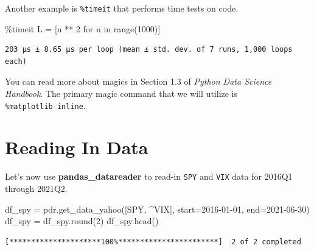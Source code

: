 \documentclass[
  letterpaper,
  DIV=11,
  numbers=noendperiod]{scrreprt}
\newenvironment{Shaded}{\begin{snugshade}}{\end{snugshade}}
\newcommand{\BuiltInTok}[1]{\textcolor[rgb]{0.00,0.23,0.31}{#1}}
\newcommand{\ControlFlowTok}[1]{\textcolor[rgb]{0.00,0.23,0.31}{#1}}
\newcommand{\DecValTok}[1]{\textcolor[rgb]{0.68,0.00,0.00}{#1}}
\newcommand{\KeywordTok}[1]{\textcolor[rgb]{0.00,0.23,0.31}{#1}}
\newcommand{\NormalTok}[1]{\textcolor[rgb]{0.00,0.23,0.31}{#1}}
\newcommand{\OperatorTok}[1]{\textcolor[rgb]{0.37,0.37,0.37}{#1}}
\newcommand{\StringTok}[1]{\textcolor[rgb]{0.13,0.47,0.30}{#1}}
\begin{document}
Another example is \texttt{\%timeit} that performs time tests on code.

\begin{Shaded}
\begin{Highlighting}[]
\OperatorTok{\%}\NormalTok{timeit L }\OperatorTok{=}\NormalTok{ [n }\OperatorTok{**} \DecValTok{2} \ControlFlowTok{for}\NormalTok{ n }\KeywordTok{in} \BuiltInTok{range}\NormalTok{(}\DecValTok{1000}\NormalTok{)]}
\end{Highlighting}
\end{Shaded}

\begin{verbatim}
203 µs ± 8.65 µs per loop (mean ± std. dev. of 7 runs, 1,000 loops each)
\end{verbatim}

You can read more about magics in Section 1.3 of \emph{Python Data
Science Handbook}. The primary magic command that we will utilize is
\texttt{\%matplotlib\ inline}.

\hypertarget{reading-in-data-7}{%
\section{Reading In Data}\label{reading-in-data-7}}

Let's now use \textbf{pandas\_datareader} to read-in \texttt{SPY} and
\texttt{VIX} data for 2016Q1 through 2021Q2.

\begin{Shaded}
\begin{Highlighting}[]
\NormalTok{df\_spy }\OperatorTok{=}\NormalTok{ pdr.get\_data\_yahoo([}\StringTok{\textquotesingle{}SPY\textquotesingle{}}\NormalTok{, }\StringTok{\textquotesingle{}\^{}VIX\textquotesingle{}}\NormalTok{], start}\OperatorTok{=}\StringTok{\textquotesingle{}2016{-}01{-}01\textquotesingle{}}\NormalTok{, end}\OperatorTok{=}\StringTok{\textquotesingle{}2021{-}06{-}30\textquotesingle{}}\NormalTok{)}
\NormalTok{df\_spy }\OperatorTok{=}\NormalTok{ df\_spy.}\BuiltInTok{round}\NormalTok{(}\DecValTok{2}\NormalTok{)}
\NormalTok{df\_spy.head()}
\end{Highlighting}
\end{Shaded}

\begin{verbatim}
[*********************100%***********************]  2 of 2 completed
\end{verbatim}
\end{document}
